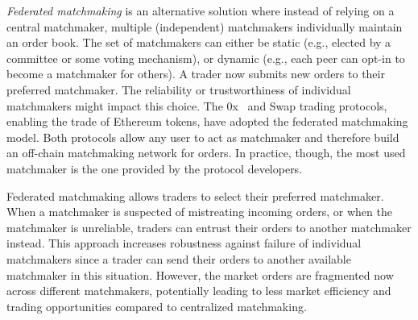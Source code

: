\emph{Federated matchmaking} is an alternative solution where instead of relying on a central matchmaker, multiple (independent) matchmakers individually maintain an order book.
The set of matchmakers can either be static (e.g., elected by a committee or some voting mechanism), or dynamic (e.g., each peer can opt-in to become a matchmaker for others).
A trader now submits new orders to their preferred matchmaker.
The reliability or trustworthiness of individual matchmakers might impact this choice.
The 0x~\cite{0x} and Swap trading protocols, enabling the trade of Ethereum tokens, have adopted the federated matchmaking model.
Both protocols allow any user to act as matchmaker and therefore build an off-chain matchmaking network for orders.
In practice, though, the most used matchmaker is the one provided by the protocol developers.



Federated matchmaking allows traders to select their preferred matchmaker.
When a matchmaker is suspected of mistreating incoming orders, or when the matchmaker is unreliable, traders can entrust their orders to another matchmaker instead.
This approach increases robustness against failure of individual matchmakers since a trader can send their orders to another available matchmaker in this situation.
However, the market orders are fragmented now across different matchmakers, potentially leading to less market efficiency and trading opportunities compared to centralized matchmaking.

